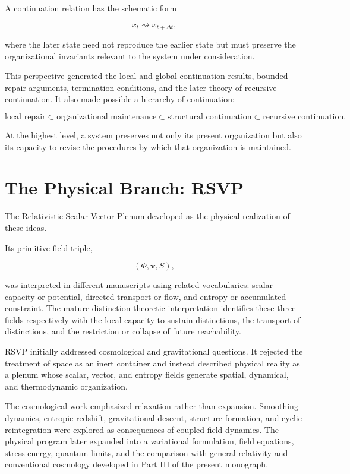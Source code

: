 \documentclass[11pt,oneside]{book}
\numberwithin{equation}{chapter}
\theoremstyle{definition}
\theoremstyle{plain}
\begin{document}
A continuation relation has the schematic form

\[
x_t
\rightsquigarrow
x_{t+\Delta t},
\]

where the later state need not reproduce the earlier state but must
preserve the organizational invariants relevant to the system under
consideration.

This perspective generated the local and global continuation results,
bounded-repair arguments, termination conditions, and the later theory of
recursive continuation. It also made possible a hierarchy of continuation:

\[
\text{local repair}
\subset
\text{organizational maintenance}
\subset
\text{structural continuation}
\subset
\text{recursive continuation}.
\]

At the highest level, a system preserves not only its present organization
but also its capacity to revise the procedures by which that organization
is maintained.

\section{The Physical Branch: RSVP}

The Relativistic Scalar Vector Plenum developed as the physical realization
of these ideas.

Its primitive field triple,

\[
(\Phi,\mathbf v,S),
\]

was interpreted in different manuscripts using related vocabularies: scalar
capacity or potential, directed transport or flow, and entropy or
accumulated constraint. The mature distinction-theoretic interpretation
identifies these three fields respectively with the local capacity to
sustain distinctions, the transport of distinctions, and the restriction or
collapse of future reachability.

RSVP initially addressed cosmological and gravitational questions. It
rejected the treatment of space as an inert container and instead described
physical reality as a plenum whose scalar, vector, and entropy fields
generate spatial, dynamical, and thermodynamic organization.

The cosmological work emphasized relaxation rather than expansion.
Smoothing dynamics, entropic redshift, gravitational descent, structure
formation, and cyclic reintegration were explored as consequences of
coupled field dynamics. The physical program later expanded into a
variational formulation, field equations, stress-energy, quantum limits,
and the comparison with general relativity and conventional cosmology
developed in Part III of the present monograph.
\end{document}
